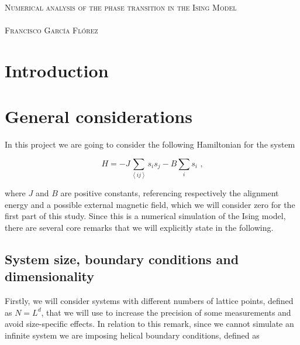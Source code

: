 \documentclass[8 pt, twocolumn]{article}
\newcommand{\avg}[1]{\left\langle #1 \right\rangle}
\begin{document}

\begin{minipage}[b]{\linewidth}
  \centering
  \Large \textsc{Numerical analysis of the phase transition in the Ising Model}\\
  ~\\
  \large \textsc{Francisco García Flórez}
\end{minipage}

\section{Introduction}


\section{General considerations}


In this project we are going to consider the following Hamiltonian for the system

\begin{equation} H = - J \sum_{\avg{ij}} s_i s_j - B \sum_i s_i \text{ ,} \end{equation}

where $J$ and $B$ are positive constants, referencing respectively the alignment energy and a possible external magnetic field, which we will consider zero for the first part of this study. Since this is a numerical simulation of the Ising model, there are several core remarks that we will explicitly state in the following.

\subsection{System size, boundary conditions and dimensionality}

Firstly, we will consider systems with different numbers of lattice points, defined as $N=L^d$, that we will use to increase the precision of some measurements and avoid size-specific effects. In relation to this remark, since we cannot simulate an infinite system we are imposing helical boundary conditions, defined as
\end{document}
